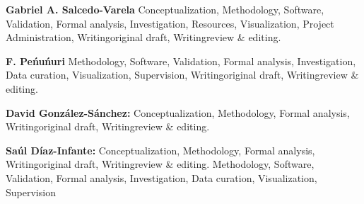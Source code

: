 \textbf{Gabriel A. Salcedo-Varela}
    Conceptualization,
    Methodology,
    Software,
    Validation,
    Formal analysis,
    Investigation,
    Resources,
    Visualization,
    Project Administration,
    Writing\textendash original draft,
    Writing\textendash review \& editing.

\textbf{F. Pe\'nu\'nuri}
    Methodology,
    Software,
    Validation,
    Formal analysis,
    Investigation,
    Data curation,
    Visualization,
    Supervision,
    Writing\textendash original draft,
    Writing\textendash review \& editing.

\textbf{David Gonz\'alez-S\'anchez:}
    Conceptualization,
    Methodology,
    Formal analysis,
    Writing\textendash original draft,
    Writing\textendash review \& editing.

\textbf{Sa\'ul D\'iaz-Infante:}
    Conceptualization,
    Methodology,
    Formal analysis,
    Writing\textendash original draft,
    Writing\textendash review \& editing.
        Methodology,
    Software,
    Validation,
    Formal analysis,
    Investigation,
    Data curation,
    Visualization,
    Supervision
